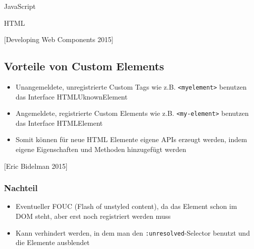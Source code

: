 JavaScript

\begin{Shaded}
\begin{Highlighting}[]
 \OperatorTok{=} \NormalTok{(}\NormalTok{)}\OperatorTok{;}
\OperatorTok{;}
\end{Highlighting}
\end{Shaded}

HTML

\begin{Shaded}
\begin{Highlighting}[]
\KeywordTok{>}
\end{Highlighting}
\end{Shaded}

{[}Developing Web Components 2015{]}

\subsection{Vorteile von Custom
Elements}\label{vorteile-von-custom-elements}

\begin{itemize}
\tightlist
\item
  Unangemeldete, unregistrierte Custom Tags wie z.B.
  \texttt{\textless{}myelement\textgreater{}} benutzen das Interface
  HTMLUknownElement
\item
  Angemeldete, registrierte Custom Elements wie z.B.
  \texttt{\textless{}my-element\textgreater{}} benutzen das Interface
  HTMLElement
\item
  Somit können für neue HTML Elemente eigene APIs erzeugt werden, indem
  eigene Eigenschaften und Methoden hinzugefügt werden
\end{itemize}

{[}Eric Bidelman 2015{]}

\subsubsection{Nachteil}\label{nachteil}

\begin{itemize}
\tightlist
\item
  Eventueller FOUC (Flash of unstyled content), da das Element schon im
  DOM steht, aber erst noch registriert werden muss
\item
  Kann verhindert werden, in dem man den \texttt{:unresolved}-Selector
  benutzt und die Elemente ausblendet
\end{itemize}

